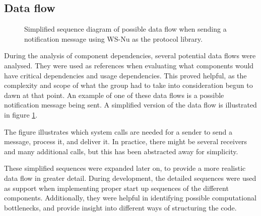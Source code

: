 \clearpage

\subsection{Data flow}
\label{subsec:architecture_and_implementation-broker_architecture-data_flow}

\begin{center}
  \begin{figure}[ht!]
    \caption{Simplified sequence diagram of possible data flow when sending a notification message using WS-Nu as the protocol library.}
    \label{fig:architecture_data_flow_simple}
  \end{figure}
\end{center}

During the analysis of component dependencies, several potential data flows were analysed. They were used as references when evaluating what components would have critical dependencies and usage dependencies. This proved helpful, as the complexity and scope of what the group had to take into consideration begun to dawn at that point. An example of one of these data flows is a possible notification message being sent. A simplified version of the data flow is illustrated in figure \ref{fig:architecture_data_flow_simple}.

The figure illustrates which system calls are needed for a sender to send a message, process it, and deliver it. In practice, there might be several receivers and many additional calls, but this has been abstracted away for simplicity.

These simplified sequences were expanded later on, to provide a more realistic data flow in greater detail. During development, the detailed sequences were used as support when implementing proper start up sequences of the different components. Additionally, they were helpful in identifying possible computational bottlenecks, and provide insight into different ways of structuring the code.

